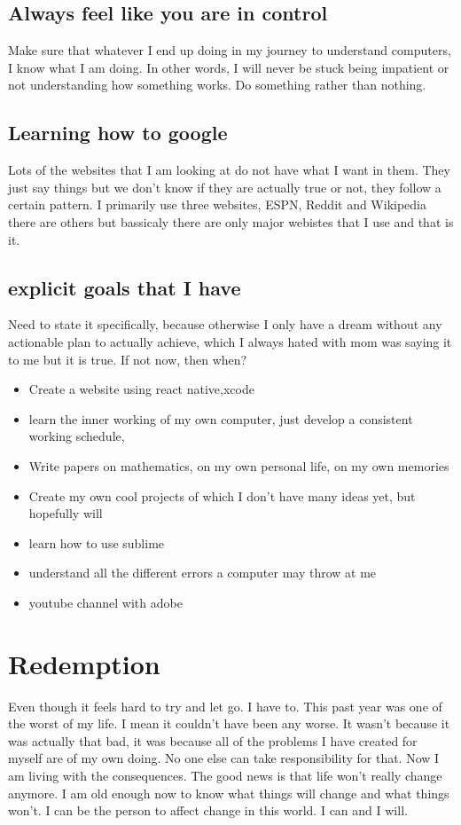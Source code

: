 \documentclass[11pt]{scrartcl}
\begin{document}
\subsection{Always feel like you are in control}
Make sure that whatever I end up doing in my journey to understand computers, I know what I am doing. In other words, I will never be stuck being impatient or not understanding how something works. Do something rather than nothing. 
\subsection{Learning how to google}
Lots of the websites that I am looking at do not have what I want in them. They just say things but we don't know if they are actually true or not, they follow a certain pattern. I primarily use three websites, ESPN, Reddit and Wikipedia there are others but bassicaly there are only major webistes that I use and that is it.
\subsection{explicit goals that I have}
Need to state it specifically, because otherwise I only have a dream without any actionable plan to actually achieve, which I always hated with mom was saying it to me but it is true. If not now, then when?
\begin{itemize}
    \item Create a website using react native,xcode
    \item learn the inner working of my own computer, just develop a consistent working schedule, 
    \item Write papers on mathematics, on my own personal life, on my own memories
    \item Create my own cool projects of which I don't have many ideas yet, but hopefully will
    \item learn how to use sublime
    \item understand all the different errors a computer may throw at me
    \item youtube channel with adobe 
    

    
\end{itemize}
\section{Redemption}
Even though it feels hard to try and let go. I have to. This past year was one of the worst of my life. I mean it couldn't have been any worse. It wasn't because it was actually that bad, it was because all of the problems I have created for myself are of my own doing. No one else can take responsibility for that. Now I am living with the consequences. The good news is that life won't really change anymore. I am old enough now to know what things will change and what things won't. I can be the person to affect change in this world. I can and I will. 
\end{document}
